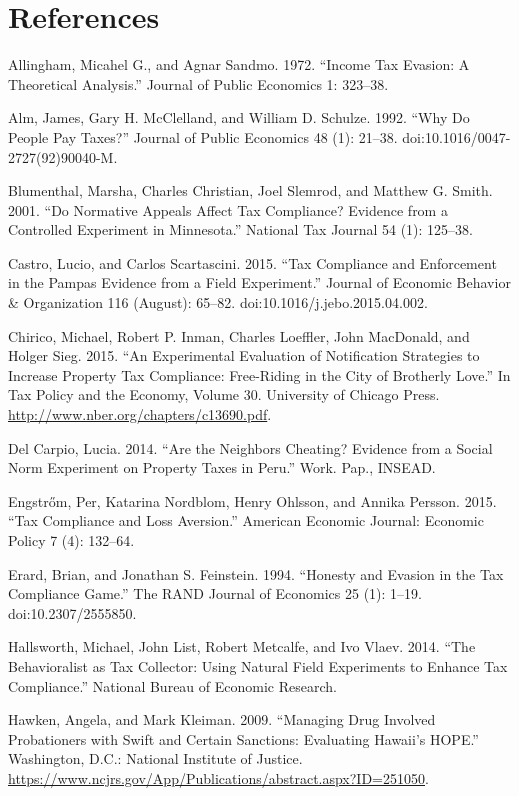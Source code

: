 \documentclass[12pt,titlepage]{article}
\begin{document}
\section{References}
Allingham, Micahel G., and Agnar Sandmo. 1972. “Income Tax Evasion: A Theoretical Analysis.” Journal of Public Economics 1: 323–38.

Alm, James, Gary H. McClelland, and William D. Schulze. 1992. “Why Do People Pay Taxes?” Journal of Public Economics 48 (1): 21–38. doi:10.1016/0047-2727(92)90040-M.

Blumenthal, Marsha, Charles Christian, Joel Slemrod, and Matthew G. Smith. 2001. “Do Normative Appeals Affect Tax Compliance? Evidence from a Controlled Experiment in Minnesota.” National Tax Journal 54 (1): 125–38.

Castro, Lucio, and Carlos Scartascini. 2015. “Tax Compliance and Enforcement in the Pampas Evidence from a Field Experiment.” Journal of Economic Behavior \& Organization 116 (August): 65–82. doi:10.1016/j.jebo.2015.04.002.

Chirico, Michael, Robert P. Inman, Charles Loeffler, John MacDonald, and Holger Sieg. 2015. “An Experimental Evaluation of Notification Strategies to Increase Property Tax Compliance: Free-Riding in the City of Brotherly Love.” In Tax Policy and the Economy, Volume 30. University of Chicago Press. \url{http://www.nber.org/chapters/c13690.pdf}.

Del Carpio, Lucia. 2014. “Are the Neighbors Cheating? Evidence from a Social Norm Experiment on Property Taxes in Peru.” Work. Pap., INSEAD.

Engstr{\H o}m, Per, Katarina Nordblom, Henry Ohlsson, and Annika Persson. 2015. “Tax Compliance and Loss Aversion.” American Economic Journal: Economic Policy 7 (4): 132–64.

Erard, Brian, and Jonathan S. Feinstein. 1994. “Honesty and Evasion in the Tax Compliance Game.” The RAND Journal of Economics 25 (1): 1–19. doi:10.2307/2555850.

Hallsworth, Michael, John List, Robert Metcalfe, and Ivo Vlaev. 2014. “The Behavioralist as Tax Collector: Using Natural Field Experiments to Enhance Tax Compliance.” National Bureau of Economic Research.

Hawken, Angela, and Mark Kleiman. 2009. “Managing Drug Involved Probationers with Swift and Certain Sanctions: Evaluating Hawaii’s HOPE.” Washington, D.C.: National Institute of Justice. \url{https://www.ncjrs.gov/App/Publications/abstract.aspx?ID=251050}.
\end{document}
